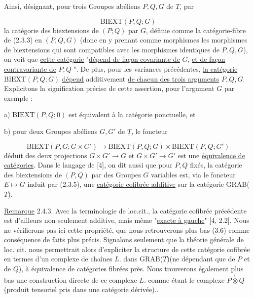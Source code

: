 Ainsi, désignant, pour trois Groupes abéliens $P,Q,G$ de $\underline{T}$, par

\begin{equation}\tag{2.4.1}
\mathrm{BIEXT}(P,Q;G)
\end{equation}
la catégorie des biextensions de $(P;Q)$ par $G$, définie comme la catégorie-fibre de (2.3.3) en $(P,Q,G)$ (donc en y prenant comme morphismes les morphismes de biextensions qui sont compatibles avec les morphismes identiques de $P,Q,G$), on voit que \underline{cette catégorie} "\underline{dépend de façon covariante de} $G$, \underline{et de façon contravariante de} $P,Q$ ". De plus, pour les variances précédentes, \underline{la catégorie} $\mathrm{BIEXT}(P,Q;G)$ \underline{dépend} additivement \underline{de chacun des trois arguments} $P,Q,G$. Explicitons la signification précise de cette assertion, pour l'argument $G$ par exemple :

a)   $\mathrm{BIEXT}(P,Q;0)$ est équivalent à la catégorie ponctuelle, et

b)   pour deux Groupes abéliens $G,G'$ de $\underline{T}$, le foncteur

\begin{equation}\tag{2.4.2}
\mathrm{BIEXT}(P,G;G\times G') \longrightarrow \mathrm{BIEXT}(P,Q;G) \times \mathrm{BIEXT}(P,Q;G')
\end{equation}
déduit des deux projections $G \times G' \longrightarrow G$ et $G\times G' \longrightarrow G'$ est une \underline{équivalence de catégories}. Dans le langage de [4], on dit aussi que pour $P,Q$ fixés, la catégorie des biextensions de $(P,Q)$ par des Groupes $G$ variables est,
via le foncteur $E \longmapsto G$ induit par (2.3.5), une \underline{catégorie cofibrée additive} sur la catégorie GRAB(\underline{$T$}).

\underline{Remarque} 2.4.3. Avec la terminologie de loc.cit., la catégorie cofibrée précédente est d'ailleurs non seulement additive, mais même "\underline{exacte à gauche}" [4, 2.2]. Nous ne vérifierons pas ici cette propriété, que nous retrouverons plus bas (3.6) comme conséquence de faits plus précis. Signalons seulement que la théorie générale de loc. cit. nous permettrait alors d'expliciter la structure de cette catégorie cofibrée en termes d'un complexe de chaînes $L$. dans GRAB(\underline{$T$})(ne dépendant que de $P$ et de $Q$), à équivalence de catégories fibrées près. Nous trouverons également plus bas une construction directe de ce complexe $L$. comme étant le complexe $P \overset{\mathbb{L}}{\otimes} Q$ (produit tensoriel pris dans une catégorie dérivée)..


